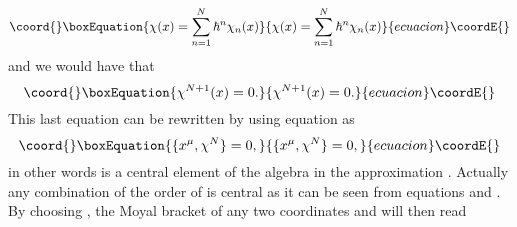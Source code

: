 \documentclass[a4paper,12pt]{article}
\begin{document}
\begin{equation}\coord{}\boxEquation{
{\chi}(x)=\sum_{n=1}^{N}{\hbar}^n{\chi}_n(x)
}{
{\chi}(x)=\sum_{n=1}^{N}{\hbar}^n{\chi}_n(x)
}{ecuacion}\coordE{}\end{equation}
and we would have that
\begin{equation}\coord{}\boxEquation{
{\chi}^{N+1}(x)=0.
}{
{\chi}^{N+1}(x)=0.
}{ecuacion}\coordE{}\end{equation}
This last equation can be rewritten by using  equation \coordHE{} as
\begin{equation}\coord{}\boxEquation{
\{x^{\mu},{\chi}^N\}=0,
}{
\{x^{\mu},{\chi}^N\}=0,
}{ecuacion}\coordE{}\end{equation}
in other words \coordHE{} is a central element of the algebra
\coordHE{} in the \coordHE{} approximation . Actually any
combination of the order of \coordHE{} is central as it can be
seen from equations \coordHE{} and \coordHE{} . By choosing \coordHE{} , the Moyal bracket of any two coordinates
\coordHE{} and \coordHE{} will then read
\end{document}
